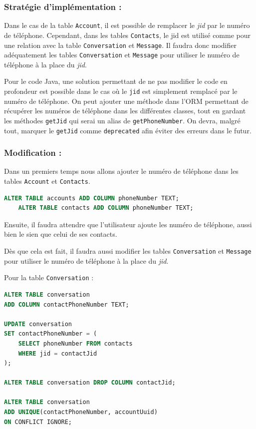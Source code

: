 \documentclass[a4paper,11pt]{article}
\begin{document}
\subsubsection*{Stratégie d'implémentation :}

Dans le cas de la table \texttt{Account}, il est possible de remplacer le \textit{jid} par le numéro de téléphone. Cependant, dans les tables \texttt{Contacts}, le jid est utilisé comme pour une relation avec la table \texttt{Conversation} et \texttt{Message}. Il faudra donc modifier adéquatement les tables \texttt{Conversation} et \texttt{Message} pour utiliser le numéro de téléphone à la place du \textit{jid}.

Pour le code Java, une solution permettant de ne pas modifier le code en profondeur est possible dans le cas où le \texttt{jid} est simplement remplacé par le numéro de téléphone. On peut ajouter une méthode dans l'ORM permettant de récupérer les numéros de téléphone dans les différentes classes, tout en gardant les méthodes \texttt{getJid} qui serai un alias de \texttt{getPhoneNumber}. On devra, malgré tout, marquer le \texttt{getJid} comme \texttt{deprecated} afin éviter des erreurs dans le futur.

\subsubsection*{Modification :}

Dans un premiers temps nous allons ajouter le numéro de téléphone dans les tables \texttt{Account} et \texttt{Contacts}.

\begin{lstlisting}[language=SQL]
	ALTER TABLE accounts ADD COLUMN phoneNumber TEXT;
	ALTER TABLE contacts ADD COLUMN phoneNumber TEXT;
\end{lstlisting}

Ensuite, il faudra attendre que l'utilisateur ajoute les numéro de téléphone, aussi bien le sien que celui de ses contacts. 

Dès que cela est fait, il faudra aussi modifier les tables \texttt{Conversation} et \texttt{Message} pour utiliser le numéro de téléphone à la place du \textit{jid}.

Pour la table \texttt{Conversation} :

\begin{lstlisting}[language=SQL]
ALTER TABLE conversation 
ADD COLUMN contactPhoneNumber TEXT;

UPDATE conversation 
SET contactPhoneNumber = (
	SELECT phoneNumber FROM contacts 
	WHERE jid = contactJid
);

ALTER TABLE conversation DROP COLUMN contactJid;

ALTER TABLE conversation 
ADD UNIQUE(contactPhoneNumber, accountUuid)
ON CONFLICT IGNORE;
\end{lstlisting}
\end{document}
